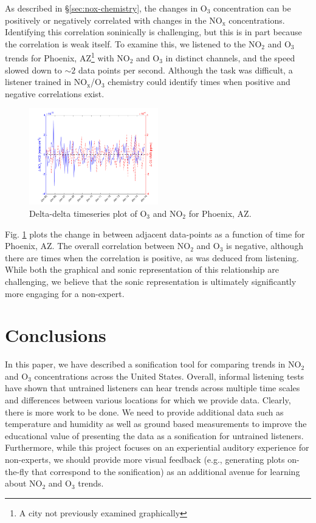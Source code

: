 \documentclass[a4paper,10pt,oneside]{article}
\newcommand{\ce}[1]{$\mathrm{#1}$}
\begin{document}
\begin{sloppy}
	As described in \S\ref{sec:nox-chemistry}, the changes in \ce{O_3} concentration can be positively or negatively correlated with changes in the \ce{NO_x} concentrations. Identifying this correlation soninically is challenging, but this is in part because the correlation is weak itself. To examine this, we listened to the \ce{NO_2} and \ce{O_3} trends for Phoenix, AZ\footnote{A city not previously examined graphically} with \ce{NO_2} and \ce{O_3} in distinct channels, and the speed slowed down to $\sim 2$ data points per second.  Although the task was difficult, a listener trained in \ce{NO_x}/\ce{O_3} chemistry could identify times when positive and negative correlations exist.  
	
	\begin{figure}
	\centering
	\includegraphics[width=0.5\textwidth]{figs/delta-delta-timeser-phoenix_AZ.png} 
	\caption{Delta-delta timeseries plot of \ce{O_3} and \ce{NO_2} for Phoenix, AZ.}
	\label{fig:del-del}
	\end{figure}
	
	Fig. \ref{fig:del-del} plots the change in  between adjacent data-points as a function of time for Phoenix, AZ. The overall correlation between \ce{NO_2} and \ce{O_3} is negative, although there are times when the correlation is positive, as was deduced from listening. While both the graphical and sonic representation of this relationship are challenging, we believe that the sonic representation is ultimately significantly more engaging for a non-expert.

\section{Conclusions}
In this paper, we have described a sonification tool for comparing trends in \ce{NO_2} and \ce{O_3} concentrations across the United States.  Overall, informal listening tests have shown that untrained listeners can  hear trends across multiple time scales and differences between various locations for which we provide data.  Clearly, there is more work to be done. We need to provide additional data such as temperature and humidity as well as ground based measurements to improve the educational value of presenting the data as a sonification for untrained listeners.  Furthermore, while this project focuses on an experiential auditory experience for non-experts, we should provide more visual feedback (e.g., generating plots on-the-fly that correspond to the sonification) as an additional avenue for learning about \ce{NO_2} and \ce{O_3} trends.  



\end{sloppy}
\end{document}
